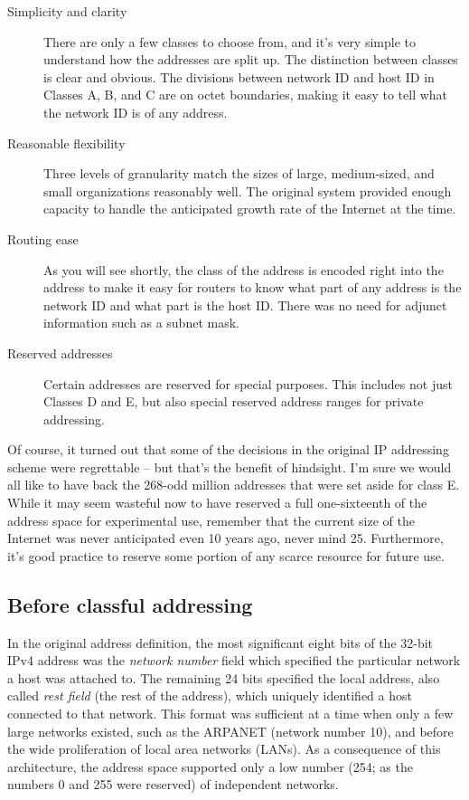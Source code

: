 \begin{description}
   \item[Simplicity and clarity]
      There are only a few classes to choose from, and it's very simple to understand how the addresses are split up.
      The distinction between classes is clear and obvious.
      The divisions between network ID and host ID in Classes A, B, and C are on octet boundaries, making it easy to tell what the network ID is of any address.

   \item[Reasonable flexibility]
      Three levels of granularity match the sizes of large, medium-sized, and small organizations reasonably well.
      The original system provided enough capacity to handle the anticipated growth rate of the Internet at the time.

   \item[Routing ease]
      As you will see shortly, the class of the address is encoded right into the address to make it easy for routers to know what part of any address is the network ID and what part is the host ID.
      There was no need for adjunct information such as a subnet mask.

   \item[Reserved addresses]
      Certain addresses are reserved for special purposes.
      This includes not just Classes D and E, but also special reserved address ranges for private addressing.
   \end{description}

Of course, it turned out that some of the decisions in the original IP addressing scheme were regrettable -- but that's the benefit of hindsight.
I'm sure we would all like to have back the 268-odd million addresses that were set aside for class E.
While it may seem wasteful now to have reserved a full one-sixteenth of the address space for experimental use, remember that the current size of the Internet was never anticipated even 10 years ago, never mind 25.
Furthermore, it's good practice to reserve some portion of any scarce resource for future use.



\subsection{Before classful addressing}
In the original address definition, the most significant eight bits of the 32-bit IPv4 address was the \emph{network number} field which specified
the particular network a host was attached to.
The remaining 24 bits specified the local address, also called \emph{rest field} (the rest of the address), which uniquely identified a host connected to that network.
This format was sufficient at a time when only a few large networks existed, such as the ARPANET (network number 10), and before the wide proliferation of local area networks (LANs).
As a consequence of this architecture, the address space supported only a low number (254; as the numbers 0 and 255 were reserved) of independent networks. 

